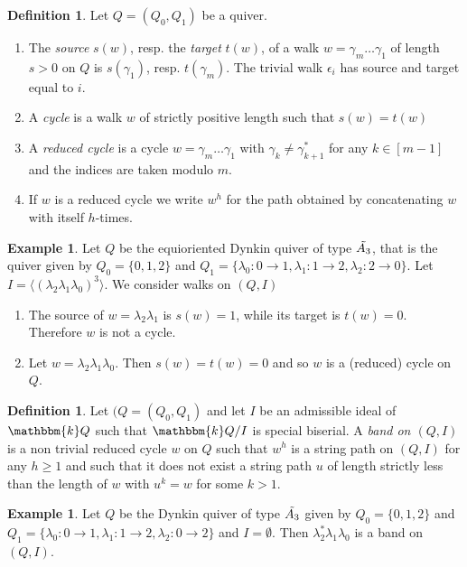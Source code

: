 \documentclass[11pt]{amsart}
\theoremstyle{definition}
\newtheorem{definition}[theorem]{Definition}
\newtheorem{example}[theorem]{Example}
\newcommand{\kk}{\mathbbm{k}}
\begin{document}
\begin{definition} Let $Q=(Q_0,Q_1)$ be a quiver.
\begin{enumerate}
\item The \emph{source} $s(w)$, resp. the \emph{target} $t(w)$, of a walk $w=\gamma_m\ldots \gamma_1$ of length $s>0$ on $Q$ is $s(\gamma_1)$, resp. $t(\gamma_m)$. The trivial walk $\epsilon_i$ has source and target equal to $i$.
\item A \emph{cycle} is a walk $w$ of strictly positive length such that $s(w)=t(w)$ 
\item A \emph{reduced cycle} is a cycle $w=\gamma_m\ldots\gamma_1$ with $\gamma_{k}\neq \gamma_{k+1}^*$ for any $k\in[m-1]$ and the indices are taken modulo $m$.
    \item If $w$ is a reduced cycle we write $w^h$ for the path obtained by concatenating $w$ with itself $h$-times.
\end{enumerate}
\end{definition}

\begin{example}
 Let $Q$ be the equioriented Dynkin quiver of type $\Tilde{A_3}$, that is the quiver given by $Q_0=\{0,1,2\}$ and $Q_1=\{\lambda_0:0\to 1, \lambda_1:1\to 2, \lambda_2:2\to 0\}$. Let $I=\langle(\lambda_2\lambda_1\lambda_0)^3\rangle$. We consider walks on $(Q,I)$ 
 \begin{enumerate}\label{exple : equioriented cycle}
     \item The source of $w=\lambda_2\lambda_1$ is $s(w)=1$, while its target is $t(w)=0$. Therefore $w$ is not a cycle.
     \item Let $w=\lambda_2\lambda_1\lambda_0$. Then $s(w)=t(w)=0$ and so $w$ is a (reduced) cycle on $Q$.
 \end{enumerate}
\end{example}

\begin{definition}
    Let $(Q=(Q_0,Q_1)$ and let $I$ be an admissible ideal of $\kk Q$ such that $\kk Q/I$ is special biserial.
    A \emph{band on $(Q,I)$} is a non trivial reduced cycle  $w$ on $Q$ such that $w^h$ is a string path  on $(Q,I)$ for any $h\geq 1$ and such that it does not exist a string path $u$ of length strictly less than the length of $w$ with $u^k=w$ for some $k> 1$.
\end{definition}

\begin{example}
Let $Q$ be the Dynkin quiver of type $\Tilde{A_3}$ given by $Q_0=\{0,1,2\}$ and $Q_1=\{\lambda_0:0\to 1, \lambda_1:1\to 2, \lambda_2:0\to 2\}$ and $I=\emptyset$. Then $\lambda_2^*\lambda_1\lambda_0$ is a band on $(Q,I)$.
\end{example}
\end{document}
